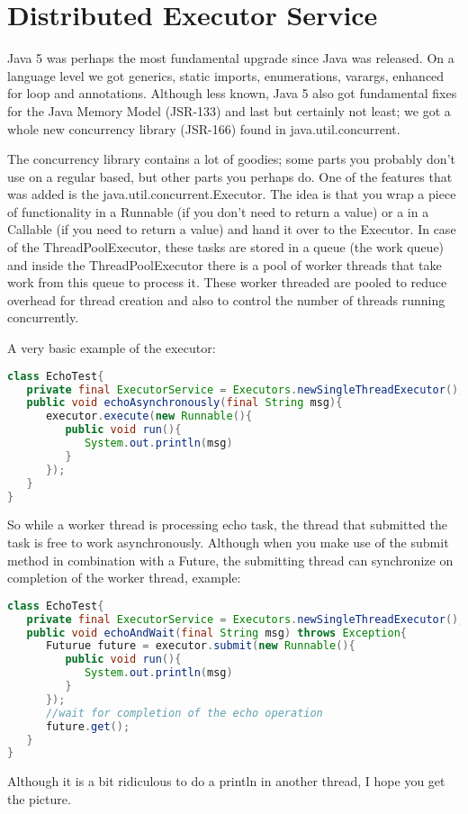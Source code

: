 \chapter{Distributed Executor Service}
Java 5 was perhaps the most fundamental upgrade since Java was released. On a language level we got generics, static imports, enumerations, varargs, enhanced for loop and annotations. Although less known, Java 5 also got fundamental fixes for the Java Memory Model (JSR-133) and last but certainly not least; we got a whole new concurrency library (JSR-166) found in java.util.concurrent.

The concurrency library contains a lot of goodies; some parts you probably don't use on a regular based, but other parts you perhaps do. One of the features that was added is the java.util.concurrent.Executor. The idea is that you wrap a piece of functionality in a Runnable (if you don't need to return a value) or a in a Callable (if you need to return a value) and hand it over to the Executor. In case of the ThreadPoolExecutor, these tasks are stored in a queue (the work queue) and inside the ThreadPoolExecutor there is a pool of worker threads that take work from this queue to process it. These worker threaded are pooled to reduce overhead for thread creation  and also to control the number of threads running concurrently.

A very basic example of the executor:
\begin{lstlisting}[language=java]
class EchoTest{
   private final ExecutorService = Executors.newSingleThreadExecutor();
   public void echoAsynchronously(final String msg){
      executor.execute(new Runnable(){
         public void run(){
            System.out.println(msg)
         }
      });	
   }
}
\end{lstlisting}
So while a worker thread is processing echo task, the thread that submitted the task is free to work asynchronously. Although when you make use of the submit method in combination with a Future, the submitting thread can synchronize on completion of the worker thread, example:
\begin{lstlisting}[language=java]
class EchoTest{
   private final ExecutorService = Executors.newSingleThreadExecutor();
   public void echoAndWait(final String msg) throws Exception{
      Futurue future = executor.submit(new Runnable(){
         public void run(){
            System.out.println(msg)
         }
      });	
      //wait for completion of the echo operation
	  future.get();
   }
}
\end{lstlisting}
Although it is a bit ridiculous to do a println in another thread, I hope you get the picture.

